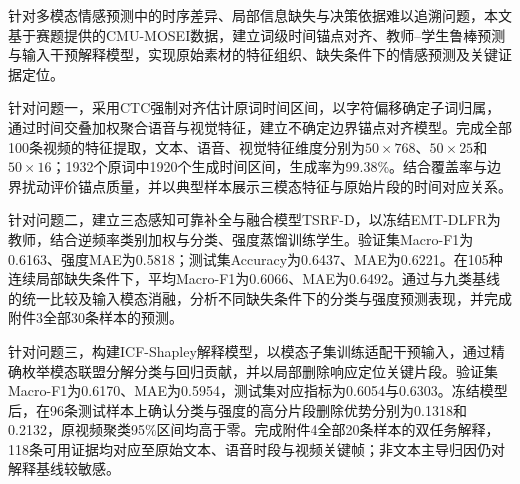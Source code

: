 针对多模态情感预测中的时序差异、局部信息缺失与决策依据难以追溯问题，本文基于赛题提供的CMU-MOSEI数据，建立词级时间锚点对齐、教师--学生鲁棒预测与输入干预解释模型，实现原始素材的特征组织、缺失条件下的情感预测及关键证据定位。

针对问题一，采用CTC强制对齐估计原词时间区间，以字符偏移确定子词归属，通过时间交叠加权聚合语音与视觉特征，建立不确定边界锚点对齐模型。完成全部100条视频的特征提取，文本、语音、视觉特征维度分别为$50\times768$、$50\times25$和$50\times16$；1932个原词中1920个生成时间区间，生成率为99.38\%。结合覆盖率与边界扰动评价锚点质量，并以典型样本展示三模态特征与原始片段的时间对应关系。

针对问题二，建立三态感知可靠补全与融合模型TSRF-D，以冻结EMT-DLFR为教师，结合逆频率类别加权与分类、强度蒸馏训练学生。验证集Macro-F1为0.6163、强度MAE为0.5818；测试集Accuracy为0.6437、MAE为0.6221。在105种连续局部缺失条件下，平均Macro-F1为0.6066、MAE为0.6492。通过与九类基线的统一比较及输入模态消融，分析不同缺失条件下的分类与强度预测表现，并完成附件3全部30条样本的预测。

针对问题三，构建ICF-Shapley解释模型，以模态子集训练适配干预输入，通过精确枚举模态联盟分解分类与回归贡献，并以局部删除响应定位关键片段。验证集Macro-F1为0.6170、MAE为0.5954，测试集对应指标为0.6054与0.6303。冻结模型后，在96条测试样本上确认分类与强度的高分片段删除优势分别为0.1318和0.2132，原视频聚类95\%区间均高于零。完成附件4全部20条样本的双任务解释，118条可用证据均对应至原始文本、语音时段与视频关键帧；非文本主导归因仍对解释基线较敏感。

